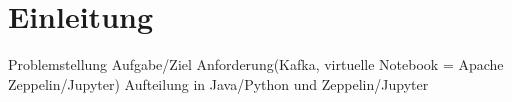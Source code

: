 \chapter{Einleitung}
\label{chap:einleitung}

Problemstellung
Aufgabe/Ziel
Anforderung(Kafka, virtuelle Notebook =  Apache Zeppelin/Jupyter)
Aufteilung in Java/Python und Zeppelin/Jupyter
